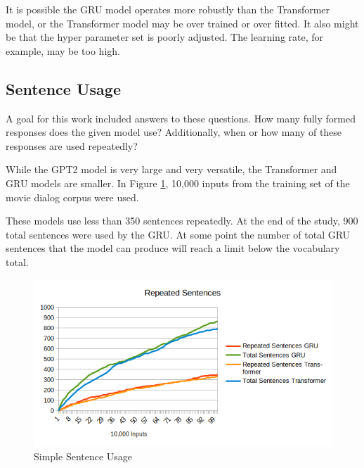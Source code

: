 It is possible the GRU model operates more robustly than the Transformer model, or the Transformer model may be over trained or over fitted. It also might be that the hyper parameter set is poorly adjusted. The learning rate, for example, may be too high.

\subsection{Sentence Usage}
A goal for this work included answers to these questions.
How many fully formed responses does the given model use? Additionally, when or how many of these responses are used repeatedly?

While the GPT2 model is very large and very versatile, the Transformer and GRU models are smaller. %
In Figure \ref{diagram-words-limit-shown}, 10,000 inputs from the training set of the movie dialog corpus were used. %

These models use less than 350 sentences repeatedly. At the end of the study, 900 total sentences were used by the GRU. At some point the number of total GRU sentences that the model can produce will reach a limit below the vocabulary total.

\begin{figure}[H]
	\begin{center}
		\includegraphics[scale=0.75]{diagram-output-repeated}
		
		
	\end{center}
	\caption[Simple Sentence Usage]{Simple Sentence Usage}
	\label{diagram-words-limit-shown}
	
\end{figure}

